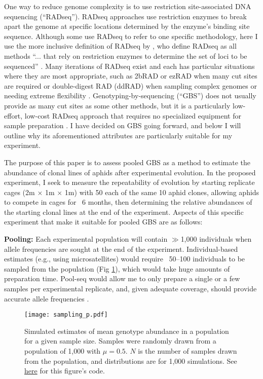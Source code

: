 One way to reduce genome complexity is to use restriction site-associated DNA 
sequencing (``RADseq'').
RADseq approaches use restriction enzymes to break apart the genome at specific 
locations determined by the enzyme's binding site sequence.
Although some use RADseq to refer to one specific methodology, here I use the more
inclusive definition of RADseq by
\citet{Andrews:2016bc}, who define RADseq as all methods 
``... that rely on restriction enzymes to determine the set of loci to be sequenced''
\citep[p 81]{Andrews:2016bc}.
Many iterations of RADseq exist and each has particular situations where they are most 
appropriate, such as 2bRAD or ezRAD when many cut sites are required or double-digest RAD
(ddRAD) when sampling complex genomes or needing extreme flexibility 
\citep{Andrews:2016bc}.
Genotyping-by-sequencing (``GBS'') does not usually provide as many cut sites as some 
other methods, but it is a particularly low-effort, low-cost RADseq approach
that requires no specialized equipment for sample preparation \citep{Elshire:2011gn}.
I have decided on GBS going forward, and below I will outline why its aforementioned
attributes are particularly suitable for my experiment.

The purpose of this paper is to assess pooled GBS as a method to estimate the abundance 
of clonal lines of aphids after experimental evolution.
In the proposed experiment, I seek to measure the repeatability of evolution by 
starting replicate cages (2m $\times$ 1m $\times$ 1m) with 50 each of the same 10 aphid
clones, allowing aphids to compete in cages for ~6 months, then determining the relative
abundances of the starting clonal lines at the end of the experiment.
Aspects of this specific experiment that make it suitable for pooled GBS are as follows:

\textbf{Pooling:}
Each experimental population will contain $\gg$1,000 individuals when allele frequencies 
are sought at the end of the experiment. Individual-based estimates (e.g., using 
microsatellites) would require ~50--100  individuals to be sampled from the population 
(Fig \ref{fig:sampling}), which would take huge amounts of preparation time. Pool-seq 
would allow me to only prepare a single or a few samples per  experimental 
replicate, and, given adequate coverage, should provide accurate allele frequencies 
\citep{Schlotterer:2014dk}.


\begin{figure}[!ht]
    \centering
    \texttt{[image: sampling\_p.pdf]}
    \caption{Simulated estimates of mean genotype abundance in a population for a given
        sample size. Samples were randomly drawn from a population of 1,000 with 
        $\mu = 0.5$. $N$ is the number of samples drawn from the population, and 
        distributions are for 1,000 simulations.
        See \href{https://github.com/lucasnell/mol_ecol/blob/master/samp_plot.R}{here} 
        for this figure's code.}
    \label{fig:sampling}
\end{figure}



